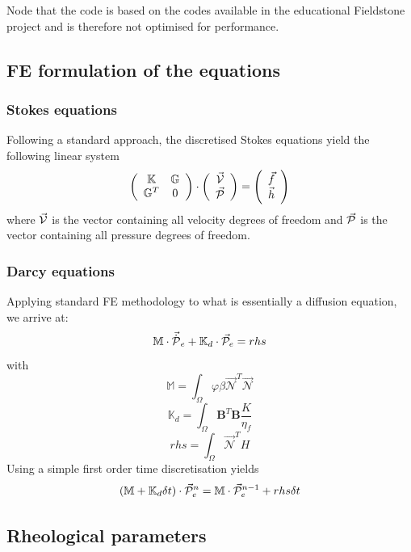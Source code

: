 \documentclass[a4paper]{article}
\newcommand{\K}{{\mathbb{K}}}
\newcommand{\G}{{\mathbb{G}}}
\newcommand{\M}{{\mathbb{M}}}
\newcommand{\bN}{{\mathcal{N}}}
\begin{document}
Node that the code is based on the codes available in the educational Fieldstone project
and is therefore not optimised for performance.

\subsection{FE formulation of the equations}


\subsubsection{Stokes equations}

Following a standard approach, the discretised Stokes equations yield
the following linear system
\[
\left(
\begin{array}{cc}
\K & \G \\
\G^T & 0 
\end{array}
\right)
\cdot
\left(
\begin{array}{c}
\vec{\cal V} \\ 
\vec{\cal P}
\end{array}
\right)
=
\left(
\begin{array}{c}
\vec{f} \\ 
\vec{h}
\end{array}
\right)
\]
where $\vec{\cal V}$ is the vector containing all velocity degrees of freedom
and $\vec{\cal P}$ is the vector containing all pressure degrees of freedom.




\subsubsection{Darcy equations}
Applying standard FE methodology to what is essentially a diffusion equation, we arrive at:
\[
{\M} \cdot {\vec{\dot{\cal{P}}}}_e  + {\K}_d \cdot \vec{\cal P}_e = rhs
\]
with
\[
{\M} = \int_\Omega \varphi \beta \vec{\bN}^T \vec{\bN} 
\]
\[
\K_d = \int_\Omega {\bm B}^T {\bm B} \frac{K}{\eta_f} 
\]
\[
rhs = \int_\Omega \vec\bN^T  H 
\]
Using a simple first order time discretisation yields
\[
({\M} + {\K}_d \delta t) \cdot \vec{\cal P}_e^n = \M \cdot \vec{\cal P}_e^{n-1} + rhs \delta t
\]


\subsection{Rheological parameters}
\end{document}
